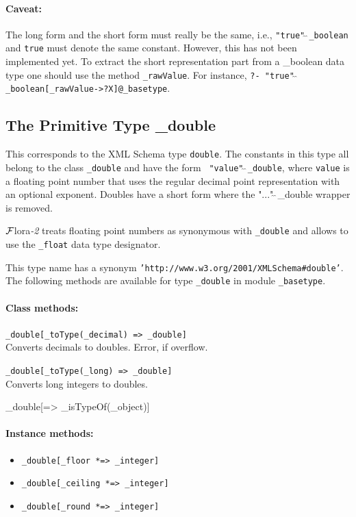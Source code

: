 \documentclass[11pt]{article}
\newcommand{\FLORA}{{\mbox{\sc ${\cal F}${lora}\rm\emph{-2}}}\xspace}
\begin{document}
\paragraph{Caveat:}  The long form and the short form must really be the
same, i.e., {\tt "true"$\hat{~}\hat{~}$\_boolean} and {\tt true}
must denote the same constant.  However, this has not been implemented yet.
To extract the short representation part from a \_boolean data
type one should use the method {\tt \_rawValue}.  For instance,
{\tt ?- "true"$\hat{~}\hat{~}$\_boolean[\_rawValue->?X]@\_basetype}.

\subsection{ The Primitive Type \_double}

This corresponds to the XML Schema type {\tt double}.  The constants in
this type all belong to the class {\tt \_double} and have the form {\tt
  "value"$\hat{~}\hat{~}$\_double}, where {\tt value} is a floating point number that uses
the regular decimal point representation with an optional exponent.
Doubles have a short form where the "..."$\hat{~}\hat{~}$\_double wrapper is removed.

\FLORA treats floating point numbers as synonymous with {\tt \_double} and
allows to use the {\tt \_float} data type designator.  

This type name has a synonym {\tt 'http://www.w3.org/2001/XMLSchema\#double'}. 
The following methods are available for type {\tt \_double} in module
{\tt \_basetype}.  


\paragraph{Class methods:}
\begin{itemize}
\item {\tt \_double[\_toType(\_decimal) => \_double]}\\  
  Converts decimals to doubles. Error, if overflow.
 \item {\tt \_double[\_toType(\_long) => \_double]}\\  
  Converts long integers to doubles.
{\tt \item \_double[=> \_isTypeOf(\_object)]}  
\end{itemize}

\paragraph{Instance methods:}
\begin{itemize}
\item {\tt \_double[\_floor *=> \_integer]}
\item {\tt \_double[\_ceiling *=> \_integer]}
\item {\tt \_double[\_round *=> \_integer]}
\end{itemize}
\end{document}

